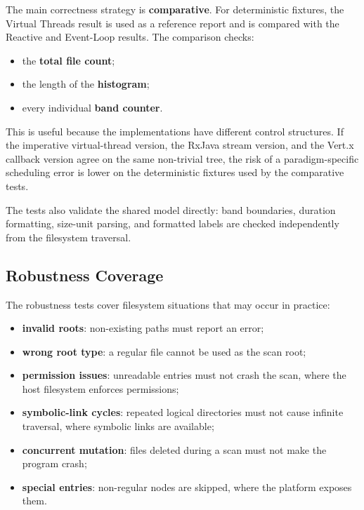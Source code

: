 The main correctness strategy is \textbf{comparative}. For deterministic
fixtures, the Virtual Threads result is used as a reference report and is
compared with the Reactive and Event-Loop results. The comparison checks:

\begin{itemize}
  \item the \textbf{total file count};
  \item the length of the \textbf{histogram};
  \item every individual \textbf{band counter}.
\end{itemize}

This is useful because the implementations have different control structures.
If the imperative virtual-thread version, the RxJava stream version, and the
Vert.x callback version agree on the same non-trivial tree, the risk of a
paradigm-specific scheduling error is lower on the deterministic fixtures used
by the comparative tests.

The tests also validate the shared model directly: band boundaries, duration
formatting, size-unit parsing, and formatted labels are checked independently
from the filesystem traversal.

\subsection{Robustness Coverage}

The robustness tests cover filesystem situations that may occur in practice:

\begin{itemize}
  \item \textbf{invalid roots}: non-existing paths must report an error;
  \item \textbf{wrong root type}: a regular file cannot be used as the scan
  root;
  \item \textbf{permission issues}: unreadable entries must not crash the scan,
  where the host filesystem enforces permissions;
  \item \textbf{symbolic-link cycles}: repeated logical directories must not
  cause infinite traversal, where symbolic links are available;
  \item \textbf{concurrent mutation}: files deleted during a scan must not make
  the program crash;
  \item \textbf{special entries}: non-regular nodes are skipped, where the
  platform exposes them.
\end{itemize}

